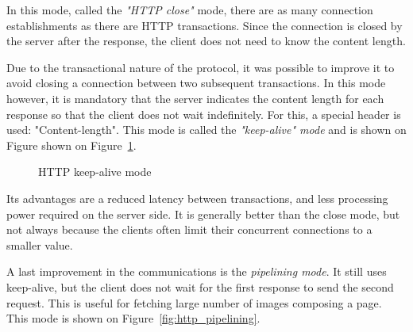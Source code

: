 In this mode, called the \emph{"HTTP close"} mode, there are as many connection
establishments as there are HTTP transactions. Since the connection is closed
by the server after the response, the client does not need to know the content
length.

Due to the transactional nature of the protocol, it was possible to improve it
to avoid closing a connection between two subsequent transactions. In this mode
however, it is mandatory that the server indicates the content length for each
response so that the client does not wait indefinitely. For this, a special
header is used: "Content-length". This mode is called the \emph{"keep-alive" mode}
and is shown on Figure shown on Figure~\ref{fig:http_keep_alive}.


\begin{figure}[!ht]
\centering
{}

\caption{HTTP keep-alive mode}
\label{fig:http_keep_alive}
\end{figure}

Its advantages are a reduced latency between transactions, and less processing
power required on the server side. It is generally better than the close mode,
but not always because the clients often limit their concurrent connections to
a smaller value.

A last improvement in the communications is the \emph{pipelining mode}. It still uses
keep-alive, but the client does not wait for the first response to send the
second request. This is useful for fetching large number of images composing a
page. This mode is shown on Figure~\ref{fig:http_pipelining}.

